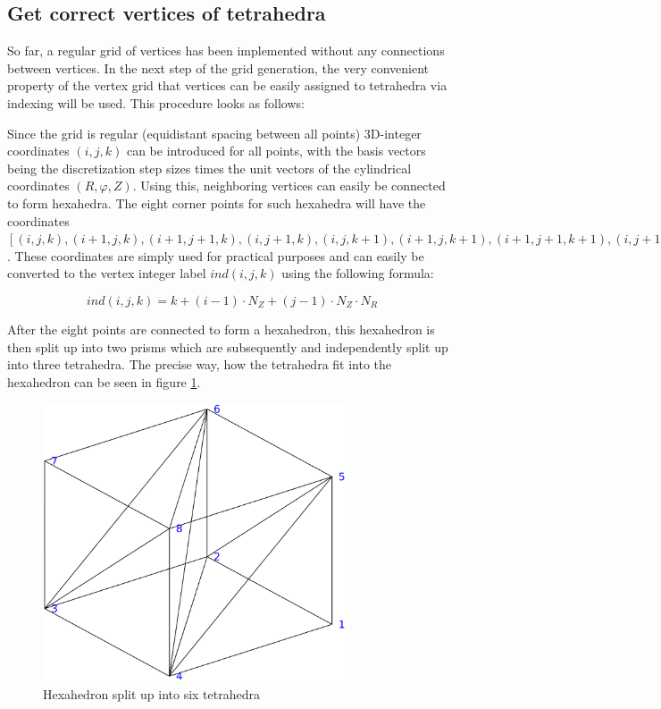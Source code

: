 \documentclass[./main.tex]{subfiles}
\begin{document}
\subsection{Get correct vertices of tetrahedra} \label{ssec:getverts}
So far, a regular grid of vertices has been implemented without any connections between vertices. In the next step of the grid generation, the very convenient property of the vertex grid that vertices can be easily assigned to tetrahedra via indexing will be used. This procedure looks as follows:

Since the grid is regular (equidistant spacing between all points) 3D-integer coordinates $(i,j,k)$ can be introduced for all points, with the basis vectors being the discretization step sizes times the unit vectors of the cylindrical coordinates $(R,\varphi,Z)$. Using this, neighboring vertices can easily be connected to form hexahedra. The eight corner points for such hexahedra will have the coordinates $[(i,j,k),(i+1,j,k),(i+1,j+1,k),(i,j+1,k),(i,j,k+1),(i+1,j,k+1),(i+1,j+1,k+1),(i,j+1,k+1)]$. These coordinates are simply used for practical purposes and can easily be converted to the vertex integer label $ind(i,j,k)$ using the following formula:

\begin{equation} \label{eq:transform_ijk_to_ind}
ind(i,j,k) = k + (i-1)\cdot N_Z + (j-1)\cdot N_Z\cdot N_R
\end{equation}

After the eight points are connected to form a hexahedron, this hexahedron is then split up into two prisms which are subsequently and independently split up into three tetrahedra. The precise way, how the tetrahedra fit into the hexahedron can be seen in figure \ref{fig:Tetrahedra_in_Cube}.

\begin{figure}
	\includegraphics[width=0.8\textwidth]{figures/Tetra_split.eps}
\captionsetup{justification=raggedright,singlelinecheck=false}  
	\caption{Hexahedron split up into six tetrahedra}
	\label{fig:Tetrahedra_in_Cube}
\end{figure}
\end{document}
